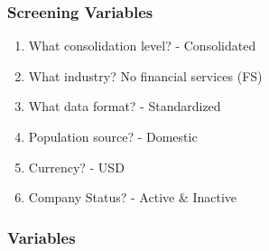 \documentclass[12pt]{article}
\begin{document}
        \subsubsection{Screening Variables}

        \begin{enumerate}
            \item What consolidation level? - Consolidated
            \item What industry? No financial services (FS) 
            \item What data format?  - Standardized 
            \item Population source? - Domestic 
            \item Currency? - USD 
            \item Company Status? - Active \& Inactive  
        \end{enumerate}

        \subsubsection{Variables}
\end{document}
